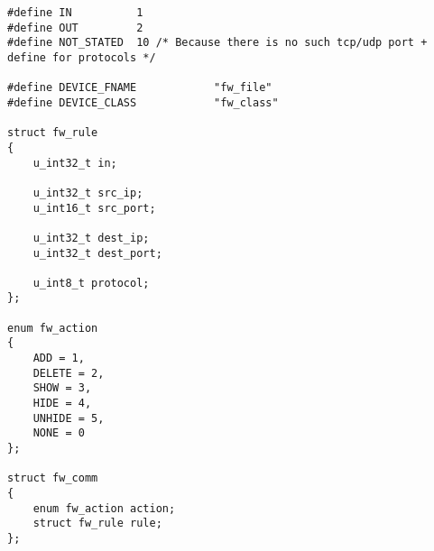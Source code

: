 \begin{lstlisting}[caption = {fw.h}]
#define IN          1
#define OUT         2
#define NOT_STATED  10 /* Because there is no such tcp/udp port + define for protocols */

#define DEVICE_FNAME            "fw_file"
#define DEVICE_CLASS            "fw_class"

struct fw_rule 
{
	u_int32_t in;
	
	u_int32_t src_ip;
	u_int16_t src_port;
	
	u_int32_t dest_ip;
	u_int32_t dest_port;
	
	u_int8_t protocol;
};

enum fw_action 
{
	ADD = 1,
	DELETE = 2,
	SHOW = 3,
	HIDE = 4,
	UNHIDE = 5,
	NONE = 0
};

struct fw_comm
{
	enum fw_action action;
	struct fw_rule rule;
};
\end{lstlisting}

\pagebreak